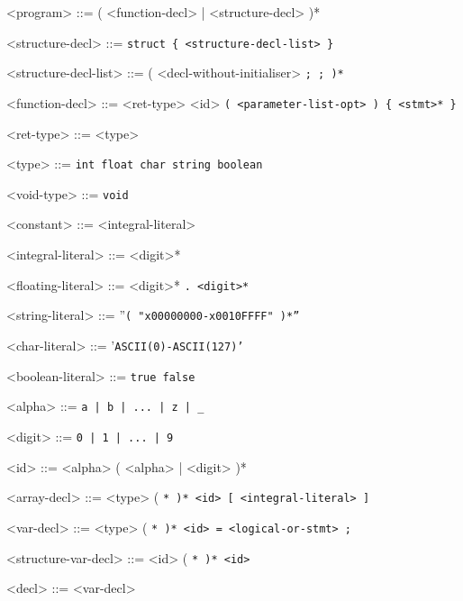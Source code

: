 \documentclass[leqno, 12pt]{article}
\begin{document}
        \setlength{\grammarindent}{12em}

        \begin{grammar}
            <program> ::= ( <function-decl> | <structure-decl> )*

            <structure-decl> ::= \tt{struct} \tt{\{} <structure-decl-list> \tt{\}}

            <structure-decl-list> ::= (
            <decl-without-initialiser> \tt{;}
             \tt{;}
            )*

            <function-decl> ::= <ret-type> <id> \tt{(} <parameter-list-opt> \tt{)} \tt{\{} <stmt>* \tt{\}}

            <ret-type> ::= <type>

            <type> ::= \tt{int}
            \alt \tt{float}
            \alt \tt{char}
            \alt \tt{string}
            \alt \tt{boolean}

            <void-type> ::= \tt{void}

            <constant> ::= <integral-literal>

            <integral-literal> ::= <digit>*
            
            <floating-literal> ::= <digit>* \tt{.} <digit>*

            <string-literal> ::= ''\tt{( "x00000000-x0010FFFF" )*}''

            <char-literal> ::= '\tt{ASCII(0)}-\tt{ASCII(127)}'

            <boolean-literal> ::= \tt{true}
            \alt \tt{false}

            <alpha> ::= \tt{a} | \tt{b} | ... | \tt{z} | \tt{_}

            <digit> ::= \tt{0} | \tt{1} | ... | \tt{9}

            <id> ::= <alpha> ( <alpha> | <digit> )*

            <array-decl> ::= <type> ( \tt{*} )* <id> \tt{[} <integral-literal> \tt{]}

            <var-decl> ::= <type> ( \tt{*} )* <id> \tt{=} <logical-or-stmt> \tt{;}
            
            <structure-var-decl> ::= <id> ( \tt{*} )* <id>

            <decl> ::= <var-decl>


\end{grammar}
\end{document}
